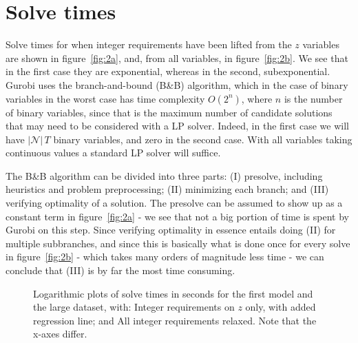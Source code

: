 \documentclass{article}
\begin{document}
\section{Solve times}
Solve times for when integer requirements have been lifted from the $z$ variables
are shown in figure~\ref{fig:2a}, and, 
from all variables, in figure~\ref{fig:2b}.
We see that in the first case they are exponential,
whereas in the second, subexponential.
Gurobi uses the branch-and-bound (B\&B) algorithm,
which in the case of binary variables
in the worst case has time complexity $O(2^n)$,
where $n$ is the number of binary variables,
since that is the maximum number of candidate solutions
that may need to be considered with a LP solver.
Indeed, in the first case we will have $\lvert \mathcal N \rvert \, T$
binary variables,
and zero in the second case.
With all variables taking continuous values a standard LP solver will suffice.

The B\&B algorithm can be divided into three parts:
(I) presolve, including heuristics and problem preprocessing;
(II) minimizing each branch;
and (III) verifying optimality of a solution.
The presolve can be assumed to show up as a constant term in figure~\ref{fig:2a} -
we see that not a big portion of time is spent by Gurobi on this step.
Since verifying optimality in essence entails doing (II) for multiple subbranches,
and since this is basically what is done once for every solve in figure~\ref{fig:2b} -
which takes many orders of magnitude less time -
we can conclude that (III) is by far the most time consuming.

\begin{figure}
    \centering
    \caption{Logarithmic plots of solve times in seconds 
    for the first model and the large dataset, with:
    \protect{} Integer requirements on $z$ only,
    with added regression line; and
    \protect{} All integer requirements relaxed.
    Note that the x-axes differ. \label{fig:2_cpu}}
\end{figure}
\end{document}
